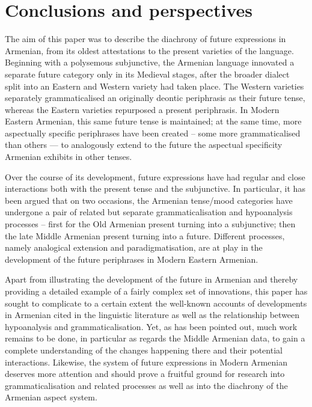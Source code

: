 \documentclass[output=paper,colorlinks,citecolor=brown]{langscibook}
\begin{document}
	\section{Conclusions and perspectives}\label{sec:meyer:conc}
	The aim of this paper was to describe the diachrony of future expressions in Armenian, from its oldest attestations to the present varieties of the language. Beginning with a polysemous subjunctive, the Armenian language innovated a separate future category only in its Medieval stages, after the broader dialect split into an Eastern and Western variety had taken place. The Western varieties separately grammaticalised an originally deontic periphrasis as their future tense, whereas the Eastern varieties repurposed a present periphrasis. In Modern Eastern Armenian, this same future tense is maintained; at the same time, more aspectually specific periphrases have been created – some more grammaticalised than others — to analogously extend to the future the aspectual specificity Armenian exhibits in other tenses.
	
	Over the course of its development, future expressions have had regular and close interactions both with the present tense and the subjunctive. In particular, it has been argued that on two occasions, the Armenian tense/mood categories have undergone a pair of related but separate grammaticalisation and hypoanalysis processes – first for the Old Armenian present turning into a subjunctive; then the late Middle Armenian present turning into a future. Different processes, namely analogical extension and paradigmatisation, are at play in the development of the future periphrases in Modern Eastern Armenian.
	
	Apart from illustrating the development of the future in Armenian and thereby providing a detailed example of a fairly complex set of innovations, this paper has sought to complicate to a certain extent the well-known accounts of developments in Armenian cited in the linguistic literature as well as the relationship between hypoanalysis and grammaticalisation. Yet, as has been pointed out, much work remains to be done, in particular as regards the Middle Armenian data, to gain a complete understanding of the changes happening there and their potential interactions. Likewise, the system of future expressions in Modern Armenian deserves more attention and should prove a fruitful ground for research into grammaticalisation and related processes as well as into the diachrony of the Armenian aspect system.
	
	
	
\end{document}
